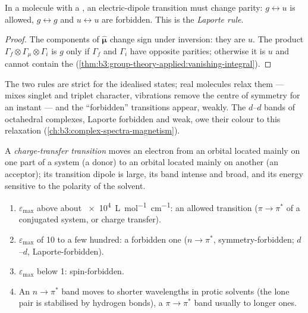 \begin{theorem}\label{thm:b3:electronic-spectroscopy:laporte}
In a molecule with a , an electric-dipole transition must
change parity: $g \leftrightarrow u$ is allowed, $g \leftrightarrow g$ and $u
\leftrightarrow u$ are forbidden. This is the \emph{Laporte rule}.
\end{theorem}

\begin{proof}
The components of $\hat{\boldsymbol\mu}$ change sign under inversion: they are $u$.
The product $\Gamma_f\otimes\Gamma_\mu\otimes\Gamma_i$ is $g$ only if $\Gamma_f$ and $\Gamma_i$
have opposite parities; otherwise it is $u$ and cannot contain the  (\cref{thm:b3:group-theory-applied:vanishing-integral}).
\end{proof}

The two rules are strict for the idealised states; real molecules relax them
---  mixes singlet and triplet character, vibrations
remove the centre of symmetry for an instant --- and the ``forbidden''
transitions appear, weakly. The $d$--$d$ bands of octahedral complexes, Laporte
forbidden and weak, owe their colour to this relaxation
(\cref{ch:b3:complex-spectra-magnetism}).

\begin{definition}\label{def:b3:electronic-spectroscopy:charge-transfer}
A \emph{charge-transfer transition} moves an
electron from an orbital located mainly on one part of a system (a donor) to
an orbital located mainly on another (an acceptor); its transition dipole is
large, its band intense and broad, and its energy sensitive to the polarity of
the solvent.
\end{definition}

\begin{method}\label{met:b3:electronic-spectroscopy:assign-band}
\begin{enumerate}
  \item $\varepsilon_{\max}$ above about \qty{e4}{L.mol^{-1}.cm^{-1}}: an allowed
        transition ($\pi\to\pi^*$ of a conjugated system, or charge transfer).
  \item $\varepsilon_{\max}$ of 10 to a few hundred: a forbidden one ($n\to\pi^*$,
        symmetry-forbidden; $d$--$d$, Laporte-forbidden).
  \item $\varepsilon_{\max}$ below 1: spin-forbidden.
  \item An $n\to\pi^*$ band moves to shorter wavelengths in protic solvents
        (the lone pair is stabilised by hydrogen bonds), a $\pi\to\pi^*$ band
        usually to longer ones.
\end{enumerate}
\end{method}

